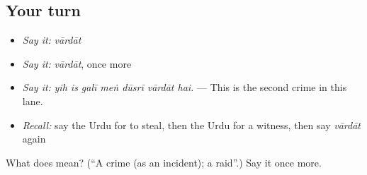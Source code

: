 \subsection*{Your turn}
\begin{itemize}
\raggedright
  \item \emph{Say it:} \emph{vārdāt}
  \item \emph{Say it:} \emph{vārdāt}, once more
  \item \emph{Say it:} \emph{yih is galī meṅ dūsrī vārdāt hai.} — This is the second crime in this lane.
  \item \emph{Recall:} say the Urdu for to steal, then the Urdu for a witness, then say \emph{vārdāt} again
\end{itemize}

\begin{tcolorbox}[breakable,colback=teal!4,colframe=teal!35!black,title={Before you move on}]
What does  mean? (\textquotedblleft{}A crime (as an incident); a raid\textquotedblright{}.) Say it once more.
\end{tcolorbox}
